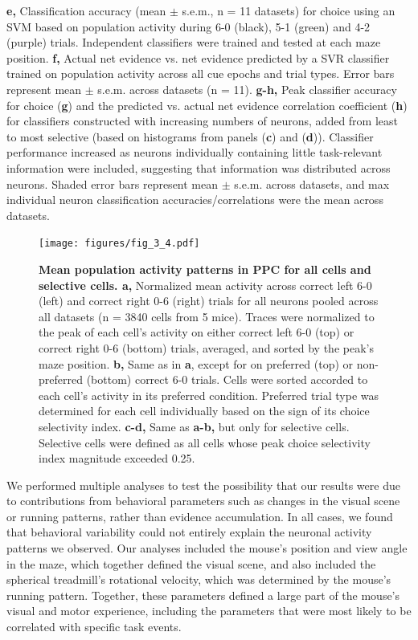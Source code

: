 \begin{FPfigure}
{%
\textbf{e,} Classification accuracy (mean $\pm$ s.e.m., n = 11 datasets) for choice using an SVM based on population activity during 6-0 (black), 5-1 (green) and 4-2 (purple) trials. Independent classifiers were trained and tested at each maze position. 
%
\textbf{f,} Actual net evidence vs. net evidence predicted by a SVR classifier trained on population activity across all cue epochs and trial types. Error bars represent mean $\pm$ s.e.m. across datasets (n = 11). 
%
\textbf{g-h,} Peak classifier accuracy for choice (\textbf{g}) and the predicted vs. actual net evidence correlation coefficient (\textbf{h}) for classifiers constructed with increasing numbers of neurons, added from least to most selective (based on histograms from panels (\textbf{c}) and (\textbf{d})). Classifier performance increased as neurons individually containing little task-relevant information were included, suggesting that information was distributed across neurons. Shaded error bars represent mean $\pm$ s.e.m. across datasets, and max individual neuron classification accuracies/correlations were the mean across datasets.
\label{fig:3_3}}
\end{FPfigure}

\begin{figure}
\texttt{[image: figures/fig\_3\_4.pdf]}
\caption[Mean population activity patterns in PPC for all cells and selective cells.]
{\textbf{Mean population activity patterns in PPC for all cells and selective cells. a,} Normalized mean activity across correct left 6-0 (left) and correct right 0-6 (right) trials for all neurons pooled across all datasets (n = 3840 cells from 5 mice). Traces were normalized to the peak of each cell's activity on either correct left 6-0 (top) or correct right 0-6 (bottom) trials, averaged, and sorted by the peak's maze position. 
%
\textbf{b,} Same as in \textbf{a}, except for on preferred (top) or non-preferred (bottom) correct 6-0 trials. Cells were sorted accorded to each cell's activity in its preferred condition. Preferred trial type was determined for each cell individually based on the sign of its choice selectivity index. 
%
\textbf{c-d,} Same as \textbf{a-b,} but only for selective cells. Selective cells were defined as all cells whose peak choice selectivity index magnitude exceeded 0.25.
\label{fig:3_4}}
\end{figure}
\clearpage

\bigskip
We performed multiple analyses to test the possibility that our results were due to contributions from behavioral parameters such as changes in the visual scene or running patterns, rather than evidence accumulation. In all cases, we found that behavioral variability could not entirely explain the neuronal activity patterns we observed. Our analyses included the mouse’s position and view angle in the maze, which together defined the visual scene, and also included the spherical treadmill’s rotational velocity, which was determined by the mouse’s running pattern. Together, these parameters defined a large part of the mouse’s visual and motor experience, including the parameters that were most likely to be correlated with specific task events. 

